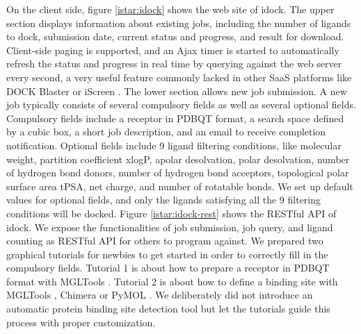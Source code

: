 On the client side, figure \ref{istar:idock} shows the web site of idock. The upper section displays information about existing jobs, including the number of ligands to dock, submission date, current status and progress, and result for download. Client-side paging is supported, and an Ajax timer is started to automatically refresh the status and progress in real time by querying against the web server every second, a very useful feature commonly lacked in other SaaS platforms like DOCK Blaster \citep{557} or iScreen \citep{899}. The lower section allows new job submission. A new job typically consists of several compulsory fields as well as several optional fields. Compulsory fields include a receptor in PDBQT format, a search space defined by a cubic box, a short job description, and an email to receive completion notification. Optional fields include 9 ligand filtering conditions, like molecular weight, partition coefficient xlogP, apolar desolvation, polar desolvation, number of hydrogen bond donors, number of hydrogen bond acceptors, topological polar surface area tPSA, net charge, and number of rotatable bonds. We set up default values for optional fields, and only the ligands satisfying all the 9 filtering conditions will be docked. Figure \ref{istar:idock-rest} shows the RESTful API of idock. We expose the functionalities of job submission, job query, and ligand counting as RESTful API for others to program against. We prepared two graphical tutorials for newbies to get started in order to correctly fill in the compulsory fields. Tutorial 1 is about how to prepare a receptor in PDBQT format with MGLTools \citep{596}. Tutorial 2 is about how to define a binding site with MGLTools \citep{596}, Chimera \citep{1219} or PyMOL \citep{1221}. We deliberately did not introduce an automatic protein binding site detection tool but let the tutorials guide this process with proper customization.

